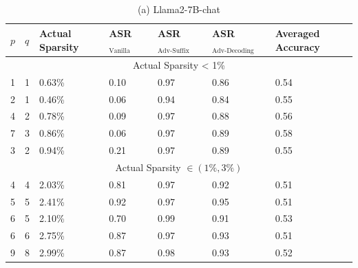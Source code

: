 \documentclass[10pt]{article}
\begin{document}
\begin{table}[h]
\begin{center}
\begin{tabular}{|l|l|l|l|l|l|l|}
\hline
$p$ & $q$ & Actual Sparsity & ASR $_{\text {Vanilla }}$ & ASR $_{\text {Adv-Suffix }}$ & ASR $_{\text {Adv-Decoding }}$ & Averaged Accuracy \\
\hline
\multicolumn{7}{|c|}{Actual Sparsity < 1\%} \\
\hline
1 & 1 & 0.63\% & 0.10 & 0.97 & 0.86 & 0.54 \\
\hline
2 & 1 & 0.46\% & 0.06 & 0.94 & 0.84 & 0.55 \\
\hline
4 & 2 & 0.78\% & 0.09 & 0.97 & 0.88 & 0.56 \\
\hline
7 & 3 & 0.86\% & 0.06 & 0.97 & 0.89 & 0.58 \\
\hline
3 & 2 & 0.94\% & 0.21 & 0.97 & 0.89 & 0.55 \\
\hline
\multicolumn{7}{|c|}{Actual Sparsity $\in(1 \%, 3 \%)$} \\
\hline
4 & 4 & 2.03\% & 0.81 & 0.97 & 0.92 & 0.51 \\
\hline
5 & 5 & 2.41\% & 0.92 & 0.97 & 0.95 & 0.51 \\
\hline
6 & 5 & 2.10\% & 0.70 & 0.99 & 0.91 & 0.53 \\
\hline
6 & 6 & 2.75\% & 0.87 & 0.97 & 0.93 & 0.51 \\
\hline
9 & 8 & 2.99\% & 0.87 & 0.98 & 0.93 & 0.52 \\
\hline
\end{tabular}
\captionsetup{labelformat=empty}
\caption{(a) Llama2-7B-chat}
\end{center}
\end{table}
\end{document}
